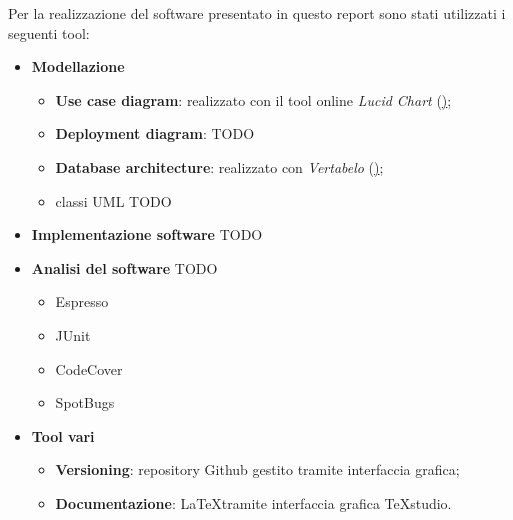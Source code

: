 Per la realizzazione del software presentato in questo report sono stati utilizzati i seguenti tool:
\begin{itemize}
	\item \textbf{Modellazione}
	\begin{itemize}
		\item \textbf{Use case diagram}: realizzato con il tool online \textit{Lucid Chart} (\href{https://www.lucidchart.com});
		\item \textbf{Deployment diagram}: TODO
		\item \textbf{Database architecture}: realizzato con \textit{Vertabelo} (\href{https://www.vertabelo.com/});
		\item classi UML TODO
	\end{itemize}
	\item \textbf{Implementazione software} TODO
	
	\item \textbf{Analisi del software} TODO
	\begin{itemize}
		\item Espresso
		\item JUnit
		\item CodeCover
		\item SpotBugs
	\end{itemize}
	\item \textbf{Tool vari}
	\begin{itemize}
		\item \textbf{Versioning}: repository Github gestito tramite interfaccia grafica;
		\item \textbf{Documentazione}: \LaTeX  tramite interfaccia grafica TeXstudio.
	\end{itemize}
\end{itemize}